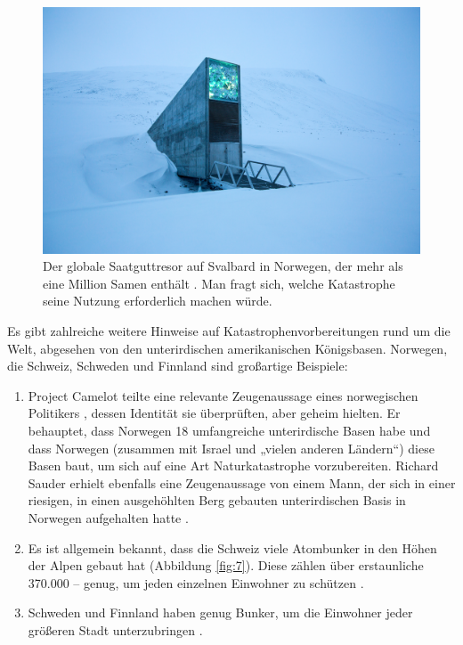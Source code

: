 \documentclass[10pt,twocolumn,letterpaper]{article}
\begin{document}
\begin{figure}[t]
\begin{center}
   \includegraphics[width=1\linewidth]{svalbard.jpg}
\end{center}
   \caption{Der globale Saatguttresor auf Svalbard in Norwegen, der mehr als eine Million Samen enthält \cite{24}. Man fragt sich, welche Katastrophe seine Nutzung erforderlich machen würde.}
\label{fig:8}
\label{fig:onecol}
\end{figure}

Es gibt zahlreiche weitere Hinweise auf Katastrophenvorbereitungen rund um die Welt, abgesehen von den unterirdischen amerikanischen Königsbasen. Norwegen, die Schweiz, Schweden und Finnland sind großartige Beispiele:
\begin{flushleft}
\begin{enumerate}
    \item Project Camelot teilte eine relevante Zeugenaussage eines norwegischen Politikers \cite{25,26}, dessen Identität sie überprüften, aber geheim hielten. Er behauptet, dass Norwegen 18 umfangreiche unterirdische Basen habe und dass Norwegen (zusammen mit Israel und „vielen anderen Ländern“) diese Basen baut, um sich auf eine Art Naturkatastrophe vorzubereiten. Richard Sauder erhielt ebenfalls eine Zeugenaussage von einem Mann, der sich in einer riesigen, in einen ausgehöhlten Berg gebauten unterirdischen Basis in Norwegen aufgehalten hatte \cite{22}.
    \item Es ist allgemein bekannt, dass die Schweiz viele Atombunker in den Höhen der Alpen gebaut hat (Abbildung \ref{fig:7}). Diese zählen über erstaunliche 370.000 – genug, um jeden einzelnen Einwohner zu schützen \cite{27}.
    \item Schweden und Finnland haben genug Bunker, um die Einwohner jeder größeren Stadt unterzubringen \cite{27}.
\end{enumerate}
\end{flushleft}
\end{document}
